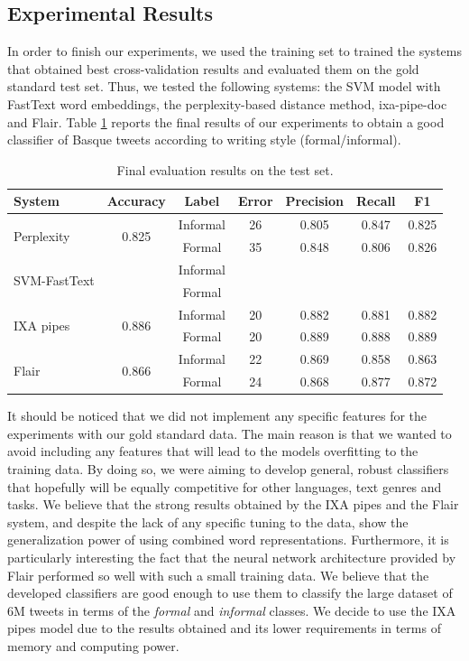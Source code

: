 \documentclass[information,article,submit,moreauthors,pdftex,10pt,a4paper]{Definitions/mdpi}
\begin{document}
\subsection{Experimental Results}\label{sec:experimental-results}

In order to finish our experiments, we used the training set to trained the systems that obtained best cross-validation results and evaluated them on the gold standard test set. Thus, we tested the following systems: the SVM model with FastText word embeddings, the perplexity-based distance method, ixa-pipe-doc and Flair. Table \ref{tab:testresults} reports the final results of our experiments to obtain a good classifier of Basque tweets according to writing style (formal/informal).

\begin{table}[H]
  \centering
  \begin{tabular}{lcccccc} \hline
    System & Accuracy & Label & Error & Precision & Recall & F1 \\ \hline \hline
    \multirow{2}{*}{Perplexity} & \multirow{2}{*}{0.825} & Informal & 26 & 0.805 & 0.847 & 0.825 \\
    & & Formal & 35 & 0.848 & 0.806 & 0.826 \\ \hline \hline
    \multirow{2}{*}{SVM-FastText} & \multirow{2}{*}{} & Informal &  &  &  &  \\
    & & Formal & &  &  &  \\ \hline \hline
    \multirow{2}{*}{IXA pipes} & \multirow{2}{*}{0.886} & Informal & 20 & 0.882 & 0.881 & 0.882 \\
    & & Formal & 20 & 0.889 & 0.888 & 0.889 \\ \hline \hline
    \multirow{2}{*}{Flair} & \multirow{2}{*}{0.866} & Informal & 22 & 0.869 & 0.858 & 0.863 \\
    & & Formal & 24 & 0.868 & 0.877 & 0.872 \\ \hline
 \end{tabular}
  \caption{Final evaluation results on the test set.}
  \label{tab:testresults}
\end{table}

It should be noticed that we did not implement any specific features for the experiments with our gold standard data. The main reason is that we wanted to avoid including any features that will lead to the models overfitting to the training data. By doing so, we were aiming to develop general, robust classifiers that hopefully will be equally competitive for other languages, text genres and tasks. We believe that the strong results obtained by the IXA pipes and the Flair system, and despite the lack of any specific tuning to the data, show the generalization power of using combined word representations. Furthermore, it is particularly interesting the fact that the neural network architecture provided by Flair performed so well with such a small training data. We believe that the developed classifiers are good enough to use them to classify the large dataset of 6M tweets in terms of the \emph{formal} and \emph{informal} classes. We decide to use the IXA pipes model due to the results obtained and its lower requirements in terms of memory and computing power.
\end{document}
